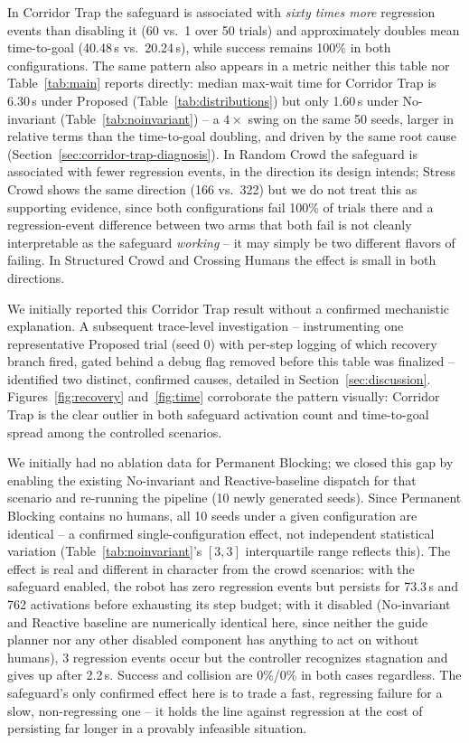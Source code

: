 \documentclass[conference,letterpaper,10pt]{ieeeconf}
\begin{document}


In Corridor Trap the safeguard is associated with \emph{sixty times more}
regression events than disabling it (60 vs.\ 1 over 50 trials) and
approximately doubles mean time-to-goal (40.48\,s vs.\ 20.24\,s), while
success remains 100\% in both configurations. The same pattern also
appears in a metric neither this table nor Table~\ref{tab:main} reports
directly: median max-wait time for Corridor Trap is 6.30\,s under Proposed
(Table~\ref{tab:distributions}) but only 1.60\,s under No-invariant
(Table~\ref{tab:noinvariant}) -- a $4\times$ swing on the same 50 seeds,
larger in relative terms than the time-to-goal doubling, and driven by the
same root cause (Section~\ref{sec:corridor-trap-diagnosis}). In Random
Crowd the safeguard is associated with fewer regression events, in the
direction its design intends; Stress Crowd shows the same direction (166
vs.\ 322) but we do not treat this as supporting evidence, since both
configurations fail 100\% of trials there and a regression-event
difference between two arms that both fail is not cleanly interpretable
as the safeguard \emph{working} -- it may simply be two different flavors
of failing. In Structured Crowd and Crossing Humans the effect is small in
both directions.

We initially reported this Corridor Trap result without a confirmed
mechanistic explanation. A subsequent trace-level investigation --
instrumenting one representative Proposed trial (seed 0) with per-step
logging of which recovery branch fired, gated behind a debug flag removed
before this table was finalized -- identified two distinct, confirmed
causes, detailed in Section~\ref{sec:discussion}.
\label{sec:corridor-trap-diagnosis}
Figures~\ref{fig:recovery} and~\ref{fig:time} corroborate the pattern
visually: Corridor Trap is the clear outlier in both safeguard activation
count and time-to-goal spread among the controlled scenarios.

We initially had no ablation data for Permanent Blocking; we closed this
gap by enabling the existing No-invariant and Reactive-baseline dispatch
for that scenario and re-running the pipeline (10 newly generated seeds).
Since Permanent Blocking contains no humans, all 10 seeds under a given
configuration are identical -- a confirmed single-configuration effect,
not independent statistical variation (Table~\ref{tab:noinvariant}'s
$[3,3]$ interquartile range reflects this). The effect is real and
different in character from the crowd scenarios: with the safeguard
enabled, the robot has zero regression events but persists for 73.3\,s
and 762 activations before exhausting its step budget; with it disabled
(No-invariant and Reactive baseline are numerically identical here, since
neither the guide planner nor any other disabled component has anything
to act on without humans), 3 regression events occur but the controller
recognizes stagnation and gives up after 2.2\,s. Success and collision
are 0\%/0\% in both cases regardless. The safeguard's only confirmed
effect here is to trade a fast, regressing failure for a slow,
non-regressing one -- it holds the line against regression at the cost of
persisting far longer in a provably infeasible situation.
\end{document}
